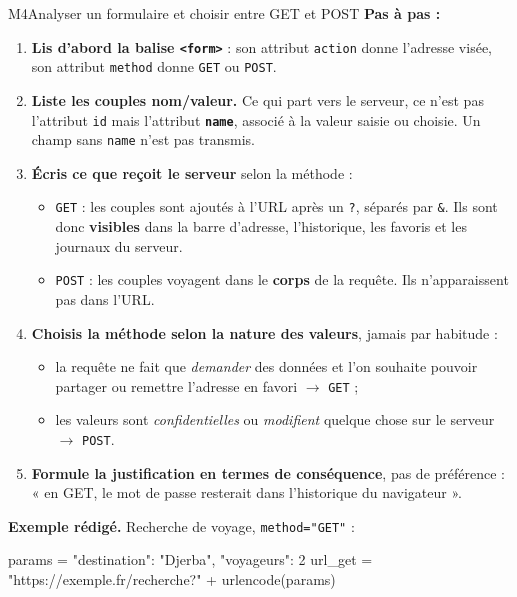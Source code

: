 \begin{fichemethode}{M4}{Analyser un formulaire et choisir entre GET et POST}
\textbf{Pas à pas :}
\begin{enumerate}
  \item \textbf{Lis d'abord la balise \lstinline{<form>}} : son attribut \lstinline{action}
        donne l'adresse visée, son attribut \lstinline{method} donne \lstinline{GET} ou
        \lstinline{POST}.
  \item \textbf{Liste les couples nom/valeur.} Ce qui part vers le serveur, ce n'est pas
        l'attribut \lstinline{id} mais l'attribut \textbf{\lstinline{name}}, associé à la
        valeur saisie ou choisie. Un champ sans \lstinline{name} n'est pas transmis.
  \item \textbf{Écris ce que reçoit le serveur} selon la méthode :
        \begin{itemize}
          \item \lstinline{GET} : les couples sont ajoutés à l'URL après un \lstinline{?},
                séparés par \lstinline{&}. Ils sont donc \textbf{visibles} dans la barre
                d'adresse, l'historique, les favoris et les journaux du serveur.
          \item \lstinline{POST} : les couples voyagent dans le \textbf{corps} de la requête.
                Ils n'apparaissent pas dans l'URL.
        \end{itemize}
  \item \textbf{Choisis la méthode selon la nature des valeurs}, jamais par habitude :
        \begin{itemize}
          \item la requête ne fait que \emph{demander} des données et l'on souhaite pouvoir
                partager ou remettre l'adresse en favori $\rightarrow$ \lstinline{GET} ;
          \item les valeurs sont \emph{confidentielles} ou \emph{modifient} quelque chose
                sur le serveur $\rightarrow$ \lstinline{POST}.
        \end{itemize}
  \item \textbf{Formule la justification en termes de conséquence}, pas de préférence :
        « en GET, le mot de passe resterait dans l'historique du navigateur ».
\end{enumerate}

\textbf{Exemple rédigé.} Recherche de voyage, \lstinline{method="GET"} :

\begin{python}
params = {"destination": "Djerba", "voyageurs": 2}
url_get = "https://exemple.fr/recherche?" + urlencode(params)
\end{python}


\end{fichemethode}
